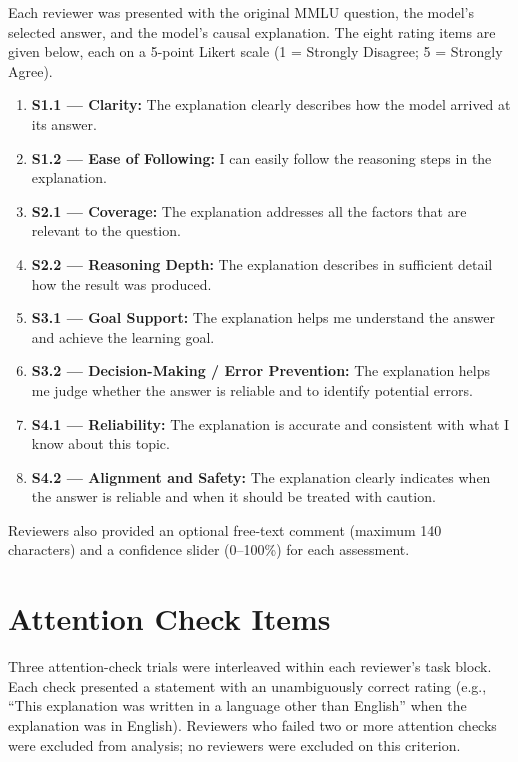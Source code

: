 Each reviewer was presented with the original MMLU question, the model's selected
answer, and the model's causal explanation. The eight rating items are given below,
each on a 5-point Likert scale (1 = Strongly Disagree; 5 = Strongly Agree).

\begin{enumerate}
  \item \textbf{S1.1 — Clarity:} The explanation clearly describes how the model
    arrived at its answer.
  \item \textbf{S1.2 — Ease of Following:} I can easily follow the reasoning steps
    in the explanation.
  \item \textbf{S2.1 — Coverage:} The explanation addresses all the factors that are
    relevant to the question.
  \item \textbf{S2.2 — Reasoning Depth:} The explanation describes in sufficient
    detail how the result was produced.
  \item \textbf{S3.1 — Goal Support:} The explanation helps me understand the answer
    and achieve the learning goal.
  \item \textbf{S3.2 — Decision-Making / Error Prevention:} The explanation helps me
    judge whether the answer is reliable and to identify potential errors.
  \item \textbf{S4.1 — Reliability:} The explanation is accurate and consistent with
    what I know about this topic.
  \item \textbf{S4.2 — Alignment and Safety:} The explanation clearly indicates when
    the answer is reliable and when it should be treated with caution.
\end{enumerate}

Reviewers also provided an optional free-text comment (maximum 140 characters) and a
confidence slider (0--100\%) for each assessment.

\section*{Attention Check Items}
\label{appsec:attention}

Three attention-check trials were interleaved within each reviewer's task block. Each
check presented a statement with an unambiguously correct rating (e.g., ``This
explanation was written in a language other than English'' when the explanation was in
English). Reviewers who failed two or more attention checks were excluded from
analysis; no reviewers were excluded on this criterion.

